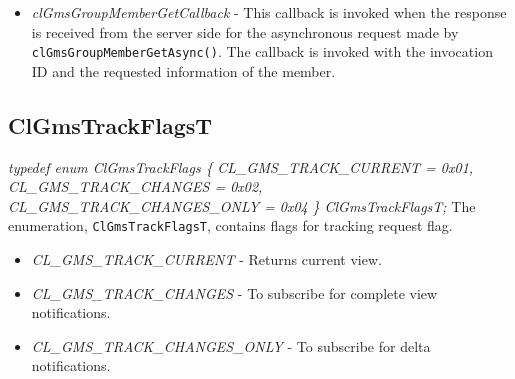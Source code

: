 \begin{flushleft}
\begin{itemize}
\item
\textit{clGmsGroupMemberGetCallback} - This callback is invoked when the response is received from the server side for
  the asynchronous request made by {\tt{clGmsGroupMemberGetAsync()}}. The callback
 is invoked with the invocation ID and the requested information of the member.
\end{itemize}


\subsection{ClGmsTrackFlagsT}
\textit{typedef enum ClGmsTrackFlags \{}
\newline\textit{CL\_\-GMS\_\-TRACK\_\-CURRENT        = 0x01, }
\newline\textit{CL\_\-GMS\_\-TRACK\_\-CHANGES        = 0x02, }
\newline\textit{CL\_\-GMS\_\-TRACK\_\-CHANGES\_\-ONLY   = 0x04  }
\newline\textit{\} ClGmsTrackFlagsT;}
\newline
The enumeration, {\tt{ClGmsTrackFlagsT}}, contains flags for tracking request flag.
\begin{itemize}
\item
\textit{CL\_\-GMS\_\-TRACK\_\-CURRENT} - Returns current view.
\item
\textit{CL\_\-GMS\_\-TRACK\_\-CHANGES} - To subscribe for complete view notifications.
\item
\textit{CL\_\-GMS\_\-TRACK\_\-CHANGES\_\-ONLY} - To subscribe for delta notifications.
\end{itemize}



\end{flushleft}
